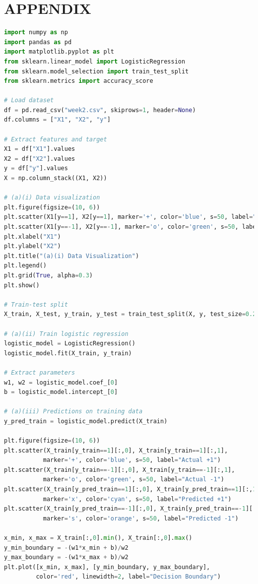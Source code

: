 \documentclass[12pt,a4paper]{article}
\begin{document}
\section*{APPENDIX}

\begin{lstlisting}[language=Python]
import numpy as np
import pandas as pd
import matplotlib.pyplot as plt
from sklearn.linear_model import LogisticRegression
from sklearn.model_selection import train_test_split
from sklearn.metrics import accuracy_score

# Load dataset
df = pd.read_csv("week2.csv", skiprows=1, header=None)
df.columns = ["X1", "X2", "y"]

# Extract features and target
X1 = df["X1"].values
X2 = df["X2"].values
y = df["y"].values
X = np.column_stack((X1, X2))

# (a)(i) Data visualization
plt.figure(figsize=(10, 6))
plt.scatter(X1[y==1], X2[y==1], marker='+', color='blue', s=50, label="Class +1")
plt.scatter(X1[y==-1], X2[y==-1], marker='o', color='green', s=50, label="Class -1")
plt.xlabel("X1")
plt.ylabel("X2")
plt.title("(a)(i) Data Visualization")
plt.legend()
plt.grid(True, alpha=0.3)
plt.show()

# Train-test split
X_train, X_test, y_train, y_test = train_test_split(X, y, test_size=0.2, random_state=42)

# (a)(ii) Train logistic regression
logistic_model = LogisticRegression()
logistic_model.fit(X_train, y_train)

# Extract parameters
w1, w2 = logistic_model.coef_[0]
b = logistic_model.intercept_[0]

# (a)(iii) Predictions on training data
y_pred_train = logistic_model.predict(X_train)

plt.figure(figsize=(10, 6))
plt.scatter(X_train[y_train==1][:,0], X_train[y_train==1][:,1], 
           marker='+', color='blue', s=50, label="Actual +1")
plt.scatter(X_train[y_train==-1][:,0], X_train[y_train==-1][:,1], 
           marker='o', color='green', s=50, label="Actual -1")
plt.scatter(X_train[y_pred_train==1][:,0], X_train[y_pred_train==1][:,1], 
           marker='x', color='cyan', s=50, label="Predicted +1")
plt.scatter(X_train[y_pred_train==-1][:,0], X_train[y_pred_train==-1][:,1], 
           marker='s', color='orange', s=50, label="Predicted -1")

x_min, x_max = X_train[:,0].min(), X_train[:,0].max()
y_min_boundary = -(w1*x_min + b)/w2
y_max_boundary = -(w1*x_max + b)/w2
plt.plot([x_min, x_max], [y_min_boundary, y_max_boundary], 
         color='red', linewidth=2, label="Decision Boundary")


\end{lstlisting}
\end{document}
